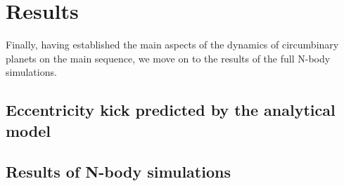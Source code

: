 \chapter{Results}
\label{ch:results}
Finally, having established the main aspects of the dynamics
of circumbinary planets on the main sequence, we move on to
the results of the full N-body simulations.

\section{Eccentricity kick predicted by the analytical model}
\label{sec:Simulations with a single planet}

\section{Results of N-body simulations}
\label{sec:Comparison to the analytical model}

